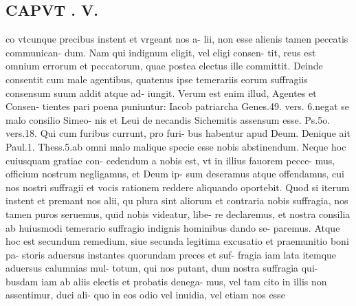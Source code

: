 \documentclass{article}
\begin{document}
\begin{pages}
\section*{CAPVT . V. }
\marginpar{[ p.339 ]}\pstart co vtcunque precibus instent et vrgeant nos a- lii, non esse alienis tamen peccatis communican- dum. Nam qui indignum eligit, vel eligi consen- tit, reus est omnium errorum et peccatorum, quae postea electus ille committit. Deinde consentit cum male agentibus, quatenus ipse temerariis eorum suffragiis consensum suum addit atque ad- iungit. Verum est enim illud, Agentes et Consen- tientes pari poena puniuntur: Iacob patriarcha Genes.49. vers. 6.negat se malo consilio Simeo- nis et Leui de necandis Sichemitis assensum esse. Ps.5o. vers.18. Qui cum furibus currunt, pro furi- bus habentur apud Deum. Denique ait Paul.1. Thess.5.ab omni malo malique specie esse nobis abstinendum. Neque hoc cuiusquam gratiae con- cedendum a nobis est, vt in illius fauorem pecce- mus, officium nostrum negligamus, et Deum ip- sum deseramus atque offendamus, cui nos nostri suffragii et vocis rationem reddere aliquando oportebit. Quod si iterum instent et premant nos alii, qu plura sint aliorum et contraria nobis suffragia, nos tamen puros seruemus, quid nobis videatur, libe- re declaremus, et nostra consilia ab huiusmodi temerario suffragio indignis hominibus dando se- paremus. Atque hoc est secundum remedium, siue secunda legitima excusatio et praemunitio boni pa- storis aduersus instantes quorundam preces et suf- fragia iam lata itemque aduersus calumnias mul- totum, qui nos putant, dum nostra suffragia qui- busdam iam ab aliis electis et probatis denega- mus, vel tam cito in illis non assentimur, duci ali- quo in eos odio vel inuidia, vel etiam nos esse  \pend

\end{pages}
\end{document}
